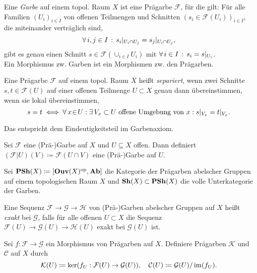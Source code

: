 \documentclass{cheat-sheet}
\newcommand{\Fais}{\mathcal{F}} %
\newcommand{\Garb}{\mathcal{G}} %
\newcommand{\Harb}{\mathcal{H}} %
\begin{document}
\begin{defn}
  Eine \emph{Garbe} auf einem topol. Raum $X$ ist eine Prägarbe $\Fais$, für die gilt:
  Für alle Familien $(U_i)_{i \in I}$ von offenen Teilmengen und Schnitten $(s_i \in \Fais(U_i))_{i \in I}$, die miteinander verträglich sind, \dh{}
  \[ \forall \, {i, j \in I} \,:\, s_i|_{U_i \cap U_j} = s_j|_{U_i \cap U_j}, \]
  gibt es genau einen Schnitt $s \in \Fais(\cup_{i \in I} U_i)$ mit $\forall \, {i \in I} \,:\, s_i = s|_{U_i}$.\\
  Ein Morphismus zw. Garben ist ein Morphismen zw. den Prägarben.
\end{defn}

\begin{defn}
  Eine Prägarbe $\Fais$ auf einem topol. Raum $X$ heißt \emph{separiert}, wenn zwei Schnitte $s, t \in \Fais(U)$ auf einer offenen Teilmenge $U \subset X$ genau dann übereinstimmen, wenn sie lokal übereinstimmen, \dh{}
  \[ s = t \iff \forall \, {x \!\in\! U\!} \,:\,\! \exists \, {V_x \subset U \text{ offene Umgebung von $x$}\!} \,:\,\! s|_{V_x} = t|_{V_x}. \]
\end{defn}

\begin{bem}
  Das entspricht dem Eindeutigkeitsteil im Garbenaxiom.
\end{bem}

\begin{bem}
  Sei $\Fais$ eine (Prä-)Garbe auf $X$ und $U \subseteq X$ offen. Dann definiert $(\Fais|U)(V) \coloneqq \Fais(U \cap V)$ eine (Prä-)Garbe auf $U$.
\end{bem}

\begin{nota}
  Sei $\mathbf{PSh}(X) \coloneqq [\mathbf{Ouv}(X)^{\mathrm{op}}, \mathbf{Ab}]$ die Kategorie der Prägarben abelscher Gruppen auf einem topologischen Raum $X$ und $\mathbf{Sh}(X) \subset \mathbf{PSh}(X)$ die volle Unterkategorie der Garben.
\end{nota}



\begin{defn}
  Eine Sequenz $\Fais \to \Garb \to \Harb$ von (Prä-)Garben abelscher Gruppen auf $X$ heißt \emph{exakt} bei $\Garb$, falls für alle offenen $U \subset X$ die Sequenz $\Fais(U) \to \Garb(U) \to \Harb(U)$ exakt bei $\Garb(U)$ ist.
\end{defn}

\begin{defn}
  Sei $f : \Fais \to \Garb$ ein Morphismus von Prägarben auf $X$. Definiere Prägarben $\mathcal{K}$ und $\mathcal{C}$ auf $X$ durch
  \[
    \mathcal{K}(U) \coloneqq \ker (f_U : \Fais(U) \to \Garb(U)), \quad
    \mathcal{C}(U) \coloneqq \Garb(U) / \im (f_U).
  \]
\end{defn}
\end{document}
